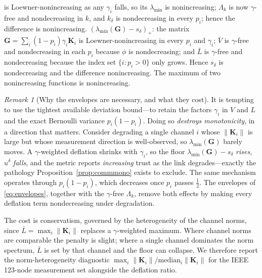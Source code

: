 \documentclass[journal]{IEEEtran}
\theoremstyle{plain}
\theoremstyle{definition}
\theoremstyle{remark}
\newtheorem{remark}{Remark}
\newcommand{\bG}{\mathbf{G}}
\newcommand{\lmin}{\lambda_{\min}}
\begin{document}
\begin{IEEEproof}
is Loewner-nonincreasing as any $\gamma_i$ falls, so its $\lmin$ is
nonincreasing; $\Lambda_{k}$ is now $\gamma$-free and nondecreasing in
$k$, and $k_{\delta}$ is nondecreasing in every $p_i$; hence the
difference is nonincreasing. $(\lmin(\bG)-s_{\delta})_{+}$: the matrix
$\bG=\sum_i(1-p_i)\gamma_i\mathbf{K}_i$ is Loewner-nonincreasing in every
$p_i$ and $\gamma_i$; $\bar V$ is $\gamma$-free and nondecreasing in each
$p_i$ because $\phi$ is nondecreasing; and $\bar L$ is $\gamma$-free and
nondecreasing because the index set $\{i:p_i>0\}$ only grows. Hence
$s_{\delta}$ is nondecreasing and the difference nonincreasing. The
maximum of two nonincreasing functions is nonincreasing.
\end{IEEEproof}

\begin{remark}[Why the envelopes are necessary, and what they cost]
\label{rem:monenv}
It is tempting to use the tightest available deviation bound---to retain
the factors $\gamma_i$ in $V$ and $L$ and the exact Bernoulli variance
$p_i(1-p_i)$. Doing so \emph{destroys monotonicity}, in a direction that
matters. Consider degrading a single channel $i$ whose
$\|\mathbf{K}_i\|$ is large but whose measurement direction is
well-observed, so $\lmin(\bG)$ barely moves. A $\gamma$-weighted deflation
shrinks with $\gamma_i$, so the floor $\lmin(\bG)-s_{\delta}$
\emph{rises}, $u^{\delta}$ \emph{falls}, and the metric reports
\emph{increasing} trust as the link degrades---exactly the pathology
Proposition~\ref{prop:commmono} exists to exclude. The same mechanism
operates through $p_i(1-p_i)$, which decreases once $p_i$ passes
$\tfrac12$. The envelopes of \eqref{eq:envelopes}, together with the
$\gamma$-free $\Lambda_k$, remove both effects by making every deflation
term nondecreasing under degradation.

The cost is conservatism, governed by the heterogeneity of the channel
norms, since $\bar L=\max_i\|\mathbf{K}_i\|$ replaces a $\gamma$-weighted
maximum. Where channel norms are comparable the penalty is slight; where a
single channel dominates the norm spectrum, $\bar L$ is set by that
channel and the floor can collapse. We therefore report the
norm-heterogeneity diagnostic
$\max_i\|\mathbf{K}_i\|/\mathrm{median}_i\|\mathbf{K}_i\|$ for the IEEE
123-node measurement set alongside the deflation ratio.
\end{remark}
\end{document}
